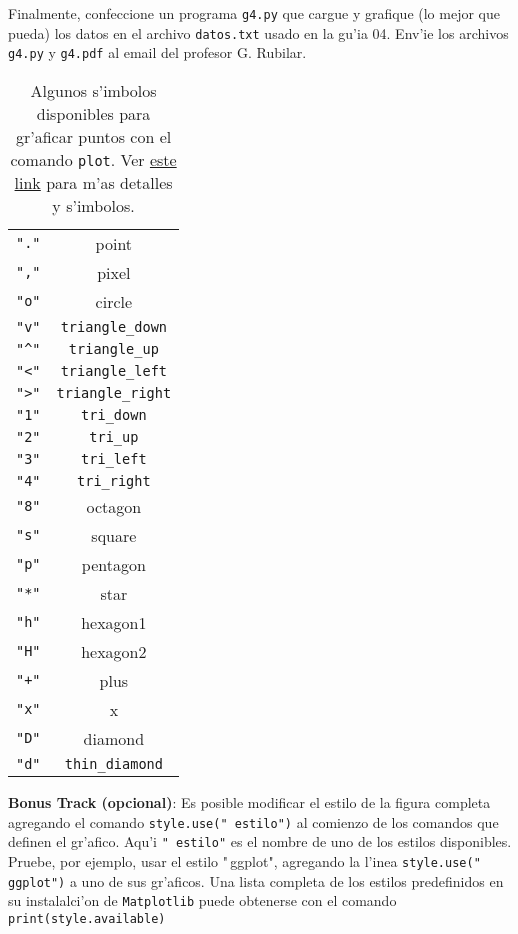 \documentclass[11pt]{exam}
\begin{document}
\begin{questions}
\item Finalmente, confeccione un programa \texttt{g4.py} que cargue y grafique (lo mejor que pueda) los datos en el archivo \texttt{datos.txt} usado en la gu'ia 04. Env'ie los archivos \texttt{g4.py} y \texttt{g4.pdf} al email del profesor G. Rubilar.
\begin{table}
\begin{center}
\begin{tabular}{cc}
\verb|"."|	& point \\
\verb|","| & pixel \\
\verb|"o"|	& circle \\
\verb|"v"|	& \verb|triangle_down| \\
\verb|"^"|	& \verb|triangle_up| \\
\verb|"<"|	& \verb|triangle_left| \\
\verb|">"|	& \verb|triangle_right| \\
\verb|"1"|	& \verb|tri_down| \\
\verb|"2"|	& \verb|tri_up| \\
\verb|"3"|	& \verb|tri_left| \\
\verb|"4"|	& \verb|tri_right| \\
\verb|"8"|	& octagon \\
\verb|"s"|	& square \\
\verb|"p"|	& pentagon \\
\verb|"*"|	& star \\
\verb|"h"|	& hexagon1 \\
\verb|"H"|	& hexagon2 \\
\verb|"+"|	& plus \\
\verb|"x"|	& x \\
\verb|"D"|	& diamond \\
\verb|"d"|	& \verb|thin_diamond| 
\end{tabular}
\caption{Algunos s'imbolos disponibles para gr'aficar puntos con el comando \texttt{plot}. Ver \href{http://matplotlib.org/api/markers_api.html}{este link} para m'as detalles y s'imbolos.}
\label{t}
\end{center}
\end{table}
\item \textbf{Bonus Track (opcional)}: Es posible modificar el estilo de la figura completa agregando el comando \texttt{style.use("\,\!estilo")} al comienzo de los comandos que definen el gr'afico. Aqu'i \texttt{"\,\!estilo"} es el nombre de uno de los estilos disponibles. Pruebe, por ejemplo, usar el estilo "\,\!ggplot", agregando la l'inea \texttt{style.use("\,\!ggplot")} a uno de sus gr'aficos. Una lista completa de los estilos predefinidos en su instalalci'on de \texttt{Matplotlib} puede obtenerse con el comando \texttt{print(style.available)}


\end{questions}
\end{document}
